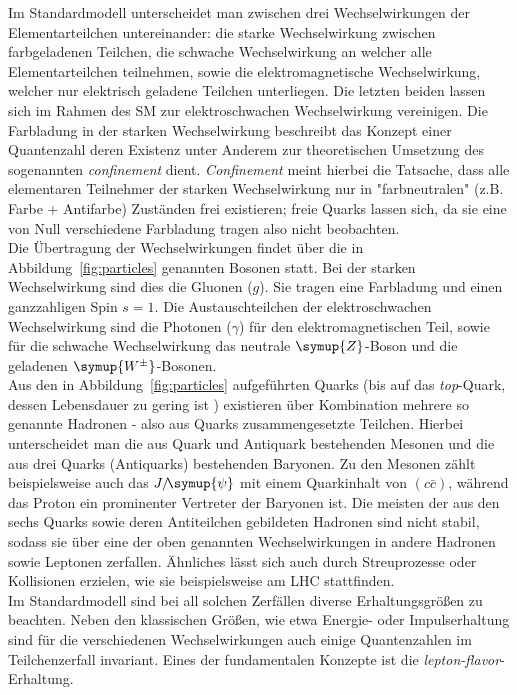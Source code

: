 Im Standardmodell unterscheidet man zwischen drei Wechselwirkungen der Elementarteilchen untereinander: die
starke Wechselwirkung zwischen farbgeladenen Teilchen, die schwache Wechselwirkung an welcher alle Elementarteilchen
teilnehmen, sowie die elektromagnetische Wechselwirkung, welcher nur elektrisch geladene Teilchen unterliegen.
Die letzten beiden lassen sich im Rahmen des SM zur elektroschwachen Wechselwirkung vereinigen.
Die Farbladung in der starken Wechselwirkung beschreibt das Konzept einer Quantenzahl deren Existenz unter
Anderem zur theoretischen Umsetzung des sogenannten \textit{confinement} dient. \textit{Confinement} meint
hierbei die Tatsache, dass alle elementaren Teilnehmer der starken Wechselwirkung nur in "farbneutralen"
(z.B. Farbe + Antifarbe) Zuständen frei existieren; freie Quarks lassen sich, da sie eine von Null verschiedene
Farbladung tragen also nicht beobachten.\\
%
Die Übertragung der Wechselwirkungen findet über die in Abbildung~\ref{fig:particles} genannten Bosonen statt.
Bei der starken Wechselwirkung sind dies die Gluonen ($g$). Sie tragen eine Farbladung und einen ganzzahligen
Spin $s=1$. Die Austauschteilchen der elektroschwachen Wechselwirkung sind die Photonen ($\gamma$) für den
elektromagnetischen Teil, sowie für die schwache Wechselwirkung das neutrale $\symup{Z}$-Boson und die geladenen
$\symup{W^{\pm}}$-Bosonen. \\
%
Aus den in Abbildung~\ref{fig:particles} aufgeführten Quarks (bis auf das \textit{top}-Quark, dessen Lebensdauer
zu gering ist \cite{pdg}) existieren über Kombination mehrere so genannte Hadronen - also aus Quarks zusammengesetzte
Teilchen. Hierbei unterscheidet man die aus Quark und Antiquark bestehenden Mesonen und die aus drei Quarks
(Antiquarks) bestehenden Baryonen. Zu den Mesonen zählt beispielsweise auch das $J/\!\symup{\psi}$ mit einem
Quarkinhalt von $(c\bar{c})$, während das Proton ein prominenter Vertreter der Baryonen ist. Die meisten der aus
den sechs Quarks sowie deren Antiteilchen gebildeten Hadronen sind nicht stabil, sodass sie über eine der oben
genannten Wechselwirkungen in andere Hadronen sowie Leptonen zerfallen. Ähnliches lässt sich auch durch Streuprozesse
oder Kollisionen erzielen, wie sie beispielsweise am LHC stattfinden.\\
%
Im Standardmodell sind bei all solchen Zerfällen diverse Erhaltungsgrößen zu beachten. Neben den klassischen Größen,
wie etwa Energie- oder Impulserhaltung sind für die verschiedenen Wechselwirkungen auch einige Quantenzahlen im
Teilchenzerfall invariant. Eines der fundamentalen Konzepte ist die \textit{lepton-flavor}-Erhaltung.
%
